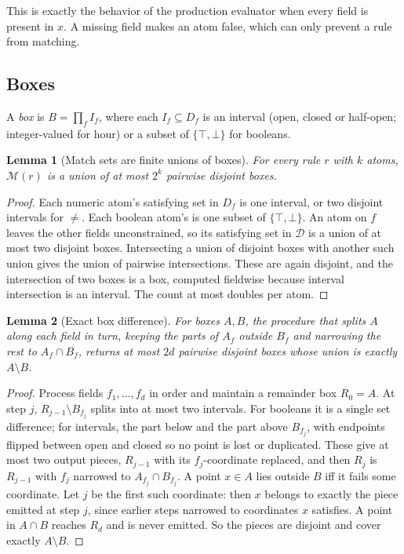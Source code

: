 \documentclass[conference]{IEEEtran}
\newtheorem{lemma}{Lemma}
\theoremstyle{definition}
\newcommand{\M}{\mathcal{M}}
\begin{document}
This is exactly the behavior of the production evaluator when every field is present in $x$. A missing field makes an atom false, which can only prevent a rule from matching.

\subsection{Boxes}
A \emph{box} is $B=\prod_{f}I_f$, where each $I_f\subseteq D_f$ is an interval (open, closed or half-open; integer-valued for hour) or a subset of $\{\top,\bot\}$ for booleans.

\begin{lemma}[Match sets are finite unions of boxes]\label{lem:boxes}
For every rule $r$ with $k$ atoms, $\M(r)$ is a union of at most $2^k$ pairwise disjoint boxes.
\end{lemma}
\begin{proof}
Each numeric atom's satisfying set in $D_f$ is one interval, or two disjoint intervals for $\ne$. Each boolean atom's is one subset of $\{\top,\bot\}$. An atom on $f$ leaves the other fields unconstrained, so its satisfying set in $\mathcal D$ is a union of at most two disjoint boxes. Intersecting a union of disjoint boxes with another such union gives the union of pairwise intersections. These are again disjoint, and the intersection of two boxes is a box, computed fieldwise because interval intersection is an interval. The count at most doubles per atom.
\end{proof}

\begin{lemma}[Exact box difference]\label{lem:diff}
For boxes $A,B$, the procedure that splits $A$ along each field in turn, keeping the parts of $A_f$ outside $B_f$ and narrowing the rest to $A_f\cap B_f$, returns at most $2d$ pairwise disjoint boxes whose union is exactly $A\setminus B$.
\end{lemma}
\begin{proof}
Process fields $f_1,\dots,f_d$ in order and maintain a remainder box $R_0=A$. At step $j$, $R_{j-1}\setminus B_{f_j}$ splits into at most two intervals. For booleans it is a single set difference; for intervals, the part below and the part above $B_{f_j}$, with endpoints flipped between open and closed so no point is lost or duplicated. These give at most two output pieces, $R_{j-1}$ with its $f_j$-coordinate replaced, and then $R_j$ is $R_{j-1}$ with $f_j$ narrowed to $A_{f_j}\cap B_{f_j}$. A point $x\in A$ lies outside $B$ iff it fails some coordinate. Let $j$ be the first such coordinate: then $x$ belongs to exactly the piece emitted at step $j$, since earlier steps narrowed to coordinates $x$ satisfies. A point in $A\cap B$ reaches $R_d$ and is never emitted. So the pieces are disjoint and cover exactly $A\setminus B$.
\end{proof}
\end{document}
